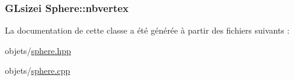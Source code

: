 \hypertarget{class_sphere_a4e8e9f5ba889e700b7244bc70232a271}{
\subsubsection[{nbvertex}]{\setlength{\rightskip}{0pt plus 5cm}G\+Lsizei Sphere\+::nbvertex\hspace{0.3cm}{\ttfamily [private]}}}\label{class_sphere_a4e8e9f5ba889e700b7244bc70232a271}


La documentation de cette classe a été générée à partir des fichiers suivants \+:\begin{DoxyCompactItemize}
\item 
objets/\hyperlink{sphere_8hpp}{sphere.\+hpp}\item 
objets/\hyperlink{sphere_8cpp}{sphere.\+cpp}\end{DoxyCompactItemize}
